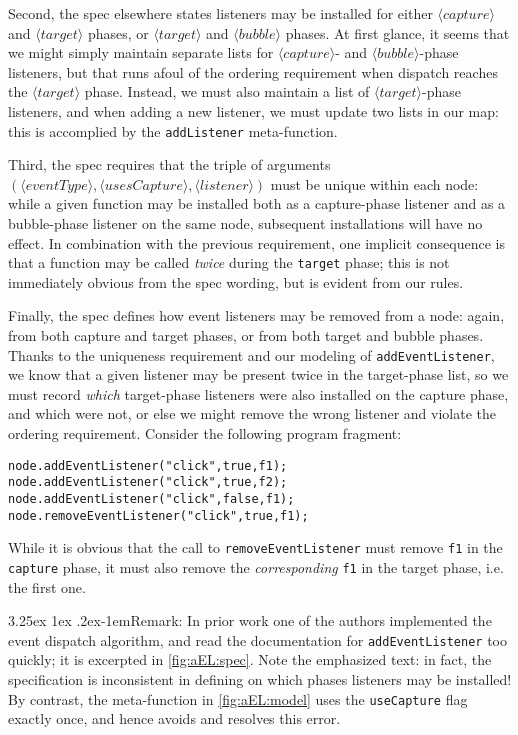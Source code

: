 \documentclass[letterpaper,10pt,twocolumn]{article}
\makeatletter
\newcommand{\paraemph}{\@startsection{paragraph}{4}{\z@}%
  {3.25ex \@plus 1ex \@minus .2ex}{-1em}{\normalfont\normalsize\itshape}}
\newcommand{\quot}{\mbox{\tt\char'042}}
\newcommand{\wild}{\mbox{\tt\char'137}}
\newcommand{\impl}[1]{{\def\_{\wild}\def\"{\quot}\tt#1}}
\newcommand{\kw}[1]{\ensuremath{\langle\mathit{#1}\rangle}}
\makeatother
\begin{document}
Second, the spec elsewhere states listeners may be installed for
either \kw{capture} and \kw{target} phases, or \kw{target} and
\kw{bubble} phases.  At first glance, it seems that we might simply
maintain separate lists for \kw{capture}- and \kw{bubble}-phase
listeners, but that runs afoul of the ordering requirement when
dispatch reaches the \kw{target} phase.  Instead, we must also
maintain a list of \kw{target}-phase listeners, and when adding a new
listener, we must update two lists in our map: this is accomplied by
the \impl{addListener} meta-function.

Third, the spec requires that the triple of arguments
$(\kw{eventType}, \kw{usesCapture}, \kw{listener})$ must be unique
within each node: while a given function may be installed both as a
capture-phase listener and as a bubble-phase listener on the same
node, subsequent installations will have no effect.  In combination
with the previous requirement, one implicit consequence is that a
function may be called \emph{twice} during the \impl{target} phase;
this is not immediately obvious from the spec wording, but is evident
from our rules.

Finally, the spec defines how event listeners may be removed from a
node: again, from both capture and target phases, or from both target
and bubble phases.  Thanks to the uniqueness requirement and our
modeling of \impl{addEventListener}, we know that a given listener may
be present twice in the target-phase list, so we must record
\emph{which} target-phase listeners were also installed on the capture
phase, and which were not, or else we might remove the wrong listener
and violate the ordering requirement.  Consider the following program
fragment:
\begin{alltt}
node.addEventListener("click", true, f1);
node.addEventListener("click", true, f2);
node.addEventListener("click", false, f1);
node.removeEventListener("click", true, f1);
\end{alltt}
While it is obvious that the call to \impl{removeEventListener} must
remove \impl{f1} in the \impl{capture} phase, it must also remove the
\emph{corresponding} \impl{f1} in the target phase, i.e. the first
one.  

\paraemph{Remark: } In prior work one of the authors implemented
the event dispatch algorithm, and read the documentation for
\impl{addEventListener} too quickly; it is excerpted in
\cref{fig:aEL:spec}.  Note the emphasized text: in fact, the specification
is inconsistent in defining on which phases listeners may be
installed!  By contrast, the meta-function in \cref{fig:aEL:model} uses
the \impl{useCapture} flag exactly once, and hence avoids and resolves
this error.
\end{document}
